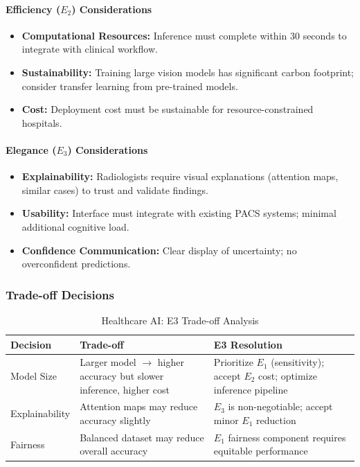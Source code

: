 \paragraph{Efficiency ($E_2$) Considerations}

\begin{itemize}[leftmargin=2em]
    \item \textbf{Computational Resources:} Inference must complete within 30 seconds to integrate with clinical workflow.
    \item \textbf{Sustainability:} Training large vision models has significant carbon footprint; consider transfer learning from pre-trained models.
    \item \textbf{Cost:} Deployment cost must be sustainable for resource-constrained hospitals.
\end{itemize}

\paragraph{Elegance ($E_3$) Considerations}

\begin{itemize}[leftmargin=2em]
    \item \textbf{Explainability:} Radiologists require visual explanations (attention maps, similar cases) to trust and validate findings.
    \item \textbf{Usability:} Interface must integrate with existing PACS systems; minimal additional cognitive load.
    \item \textbf{Confidence Communication:} Clear display of uncertainty; no overconfident predictions.
\end{itemize}

\subsubsection{Trade-off Decisions}

\begin{table}[h]
\centering
\caption{Healthcare AI: E3 Trade-off Analysis}
\label{tab:healthcare_tradeoff}
\small
\begin{tabularx}{\columnwidth}{@{}l X X@{}}
\toprule
\textbf{Decision} & \textbf{Trade-off} & \textbf{E3 Resolution} \\
\midrule
Model Size & Larger model $\rightarrow$ higher accuracy but slower inference, higher cost & Prioritize $E_1$ (sensitivity); accept $E_2$ cost; optimize inference pipeline \\
Explainability & Attention maps may reduce accuracy slightly & $E_3$ is non-negotiable; accept minor $E_1$ reduction \\
Fairness & Balanced dataset may reduce overall accuracy & $E_1$ fairness component requires equitable performance \\
\bottomrule
\end{tabularx}
\end{table}

